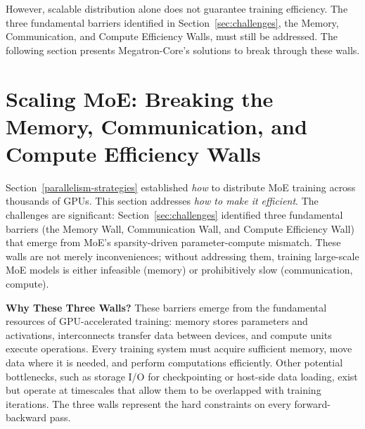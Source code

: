 However, scalable distribution alone does not guarantee training efficiency. The three fundamental barriers identified in Section~\ref{sec:challenges}, the Memory, Communication, and Compute Efficiency Walls, must still be addressed. The following section presents Megatron-Core's solutions to break through these walls.

\section{Scaling MoE: Breaking the Memory, Communication, and Compute Efficiency Walls}\label{key-features-optimizations}

Section~\ref{parallelism-strategies} established \emph{how} to distribute MoE training across thousands of GPUs. This section addresses \emph{how to make it efficient}. The challenges are significant: Section~\ref{sec:challenges} identified three fundamental barriers (the Memory Wall, Communication Wall, and Compute Efficiency Wall) that emerge from MoE's sparsity-driven parameter-compute mismatch. These walls are not merely inconveniences; without addressing them, training large-scale MoE models is either infeasible (memory) or prohibitively slow (communication, compute).

\textbf{Why These Three Walls?} These barriers emerge from the fundamental resources of GPU-accelerated training: memory stores parameters and activations, interconnects transfer data between devices, and compute units execute operations. Every training system must acquire sufficient memory, move data where it is needed, and perform computations efficiently. Other potential bottlenecks, such as storage I/O for checkpointing or host-side data loading, exist but operate at timescales that allow them to be overlapped with training iterations. The three walls represent the hard constraints on every forward-backward pass.

